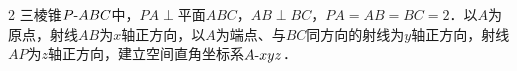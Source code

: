 \documentclass[fontset=none]{ctexart}
\begin{document}
\begin{multicols}{2}
 三棱锥\(P\text{-}\penalty100 ABC\)中，\(PA\perp\)平面\(ABC\)，\(AB\perp BC\)，\(PA=AB=BC=2\)．以\(A\)为原点，射线\(AB\)为\(x\)轴正方向，以\(A\)为端点、与\(BC\)同方向的射线为\(y\)轴正方向，射线\(AP\)为\(z\)轴正方向，建立空间直角坐标系\(A\text{-}\penalty100 xyz\)．
\xiexwei{16mm}
\begin{ansblock}[练-课时08-16]
\setlength{\anshang}{7.6mm}%
\end{ansblock}

\end{multicols}

\tailfill
\end{document}
